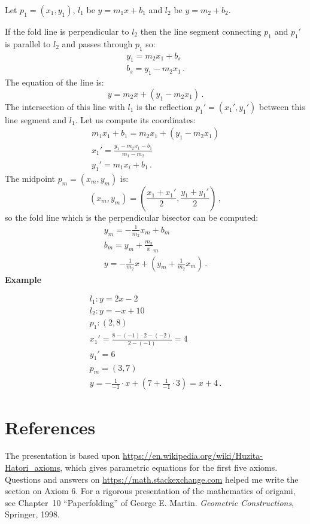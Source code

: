 \documentclass[11pt,a4paper]{article}
\newcommand*{\disfrac}[2]{\displaystyle\frac{#1}{#2}}
\newenvironment{form}[1]{%
\begin{displaymath}%
\renewcommand{\arraystretch}{#1}%
\begin{array}{lcl}}%
{\end{array}%
\end{displaymath}%
}
\begin{document}
Let $p_1=(x_1,y_1)$, $l_1$ be $y = m_1x + b_1$ and $l_2$ be $y=m_2+b_2$.

If the fold line is perpendicular to $l_2$ then the line segment connecting $p_1$ and $p_1'$ is parallel to $l_2$ and passes through $p_1$ so:
\begin{form}{1.5}
y_1=m_2x_1+b_s\\
b_s=y_1-m_2x_1\,.
\end{form}
The equation of the line is:
\[
y=m_2x+(y_1-m_2x_1)\,.
\]
The intersection of this line with $l_1$ is the reflection $p_1'=(x_1',y_1')$ between this line segment and $l_1$. Let us compute its coordinates:
\begin{form}{1.5}
m_1x_1+b_1=m_2x_1+(y_1-m_2x_1)\\
x_1'=\disfrac{y_1-m_2x_1-b_1}{m_1-m_2}\\
y_1'=m_1x_i+b_1\,.
\end{form}
The midpoint $p_m=(x_m,y_m)$ is:
\[
(x_m,y_m)=\left(\disfrac{x_1+x_1'}{2},\disfrac{y_1+y_1'}{2}\right)\,,
\]
so the fold line which is the perpendicular bisector can be computed:
\begin{form}{2}
y_m=-\disfrac{1}{m_2}x_m+b_m\\
b_m=y_m+\disfrac{m_2}x_m\\
y=-\disfrac{1}{m_2}x+\left(y_m+\disfrac{1}{m_2}x_m\right)\,.
\end{form}
\textbf{Example}

\begin{form}{2}
l_1:y=2x-2\\
l_2:y=-x+10\\
p_1:(2,8)\\
x_1'=\disfrac{8-(-1)\cdot 2-(-2)}{2-(-1)}=4\\
y_1'=6\\
p_m=(3,7)\\
y=-\disfrac{1}{-1}\cdot x+\left(7+\disfrac{1}{-1}\cdot 3\right)=x+4\,.
\end{form}



\section*{References}

The presentation is based upon \url{https://en.wikipedia.org/wiki/Huzita-Hatori_axioms}, which gives parametric equations for the first five axioms. Questions and answers on \url{https://math.stackexchange.com} helped me write the section on Axiom 6. For a rigorous presentation of the mathematics of origami, see Chapter~10 ``Paperfolding'' of George E. Martin. \textit{Geometric Constructions}, Springer, 1998.
\end{document}
